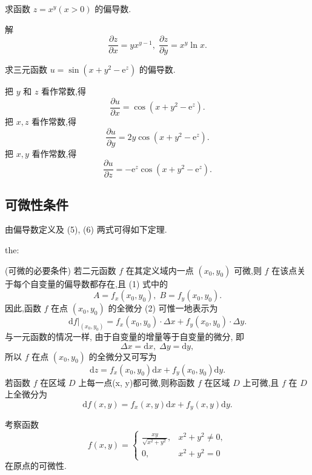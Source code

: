 \begin{example}

\end{example}
求函数 \(z = {x}^{y}\left( {x > 0}\right)\) 的偏导数.

解
\[
\frac{\partial z}{\partial x} = y{x}^{y - 1},\;\frac{\partial z}{\partial y} = {x}^{y}\ln x.
\]
\begin{example}

\end{example}
求三元函数 \(u = \sin \left( {x + {y}^{2} - {\mathrm{e}}^{z}}\right)\) 的偏导数.

\begin{solution}

\end{solution}
把 \(y\) 和 \(z\) 看作常数,得
\[
\frac{\partial u}{\partial x} = \cos \left( {x + {y}^{2} - {\mathrm{e}}^{z}}\right) .
\]
把 \(x,z\) 看作常数,得
\[
\frac{\partial u}{\partial y} = {2y}\cos \left( {x + {y}^{2} - {\mathrm{e}}^{z}}\right) .
\]
把 \(x,y\) 看作常数,得
\[
\frac{\partial u}{\partial z} =  - {\mathrm{e}}^{z}\cos \left( {x + {y}^{2} - {\mathrm{e}}^{z}}\right) .
\]
\subsection{可微性条件}

由偏导数定义及 (5), (6) 两式可得如下定理.

\begin{theorem}{}{the:}

\end{theorem}
 (可微的必要条件) 若二元函数 \(f\) 在其定义域内一点 \(\left( {{x}_{0},{y}_{0}}\right)\) 可微,则 \(f\) 在该点关于每个自变量的偏导数都存在,且 (1) 式中的
\[
A = {f}_{x}\left( {{x}_{0},{y}_{0}}\right) ,\;B = {f}_{y}\left( {{x}_{0},{y}_{0}}\right) .
\]
因此,函数 \(f\) 在点 \(\left( {{x}_{0},{y}_{0}}\right)\) 的全微分 (2) 可惟一地表示为
\[
{\left. \mathrm{d}f\right| }_{\left( {x}_{0},{y}_{0}\right) } = {f}_{x}\left( {{x}_{0},{y}_{0}}\right)  \cdot  {\Delta x} + {f}_{y}\left( {{x}_{0},{y}_{0}}\right)  \cdot  {\Delta y}.
\]
与一元函数的情况一样, 由于自变量的增量等于自变量的微分, 即
\[
{\Delta x} = \mathrm{d}x,\;{\Delta y} = \mathrm{d}y,
\]
所以 \(f\) 在点 \(\left( {{x}_{0},{y}_{0}}\right)\) 的全微分又可写为
\[
\mathrm{d}z = {f}_{x}\left( {{x}_{0},{y}_{0}}\right) \mathrm{d}x + {f}_{y}\left( {{x}_{0},{y}_{0}}\right) \mathrm{d}y.
\]
若函数 \(f\) 在区域 \(D\) 上每一点(x, y)都可微,则称函数 \(f\) 在区域 \(D\) 上可微,且 \(f\) 在 \(D\) 上全微分为
\[
\mathrm{d}f\left( {x,y}\right)  = {f}_{x}\left( {x,y}\right) \mathrm{d}x + {f}_{y}\left( {x,y}\right) \mathrm{d}y. \tag{8}
\]
\begin{example}

\end{example}
考察函数
\[
f\left( {x,y}\right)  = \left\{  \begin{array}{ll} \frac{xy}{\sqrt{{x}^{2} + {y}^{2}}}, & {x}^{2} + {y}^{2} \neq  0, \\  0, & {x}^{2} + {y}^{2} = 0 \end{array}\right.
\]
在原点的可微性.

